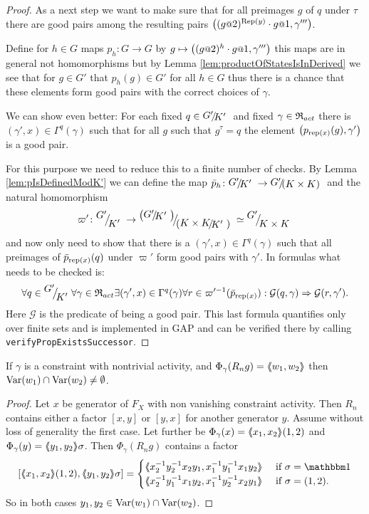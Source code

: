 \documentclass[a4paper,12pt]{article}
\begin{document}
\begin{proof}
 As a next step we want to make sure that for all preimages $g$ of $q$ under $\tau$ there are good pairs among the
 resulting pairs $\left((g\at{2})^{\textup{Rep}(y)}\cdot g\at{1},\gamma'''\right)$.
 
  Define for $h\in G$ maps $p_h\colon G\to G$ by $g\mapsto \left((g\at{2})^{h}\cdot g\at{1},\gamma'''\right)$ this maps are in general not homomorphisms but 
  by Lemma \ref{lem:productOfStatesIsInDerived} we see that for $g\in G'$ that $p_h(g)\in G'$ for all $h\in G$ thus there is a chance that these elements form good pairs with
 the correct choices of $\gamma$. 
 
 We can show even better: For each fixed $q\in\RNK{G'}{K'}$ and fixed $\gamma\in\mathfrak{R}_{act}$ there is $(\gamma',x)\in\Gamma^q(\gamma)$ such that 
 for all $g$ such that $g^\tau=q$ the element $\left(p_{\textup{rep}(x)}(g),\gamma'\right)$ is a good pair. 
 
 For this purpose we need to reduce this to a finite number of checks. By Lemma \ref{lem:pIsDefinedModK'} we can define the map $\bar p_h\colon \RNK{G'}{K'} \to \RNK{G'}{(K\times K)}$
 and the natural homomorphism \[\varpi'\colon \RNK{G'}{K'} \to \RNK{\left(\RNK{G'}{K'}\right)}{\left(\RNK{K\times K}{K'}\right)} \simeq \RNK{G'}{K\times K} \]
 and now only need to show that there is a $(\gamma',x)\in\Gamma^q(\gamma)$ such that all preimages of $\bar p_{\textup{rep}(x)}(q)$ under $\varpi'$ 
 form good pairs with $\gamma'$. In formulas what needs to be checked is: 
 \[\forall q\in\RNK{G'}{K'}
      \forall \gamma\in\Red_{act} 
	 \exists (\gamma',x)\in \Gamma^q(\gamma)
	    \forall r\in \varpi'^{-1}(\bar p_{\textup{rep}(x)}):
	      \mathcal{G}(q,\gamma) \Rightarrow \mathcal{G}(r,\gamma').\]
 Here $\mathcal{G}$ is the predicate of being a good pair. %
 This last formula quantifies only over finite sets and is implemented in GAP and can be verified there by calling \lstinline{verifyPropExistsSuccessor}.
\end{proof}
\begin{lem} \label{lem:commonVar}
 If $\gamma$ is a constraint with nontrivial activity, and $\Phi_\gamma(R_ng)=\langle\negthickspace\langle w_1,w_2\rangle\negthickspace\rangle$ then $\textup{Var}(w_1)\cap\textup{Var}(w_2)\neq \emptyset$.
\end{lem}
\begin{proof}
 Let $x$ be generator of $F_X$ with non vanishing constraint activity. 
 Then $R_n$ contains either a factor $[x,y]$ or $[y,x]$ for another generator $y$. Assume without loss of generality the first case.
 Let further be $\Phi_\gamma(x)=\langle\negthickspace\langle x_1,x_2\rangle\negthickspace\rangle(1,2)$ and $\Phi_\gamma(y)=\langle\negthickspace\langle y_1,y_2\rangle\negthickspace\rangle\sigma$. 
 Then $\Phi_\gamma(R_n g)$ contains a factor 
 \[ [\pair{x_1,x_2}(1,2),\pair{y_1,y_2}\sigma] = \begin{cases}
                                                   \pair{x_2^{-1}y_2^{-1}x_2y_1,x_1^{-1}y_1^{-1}x_1y_2} & \textup{ if } \sigma=\id \\
                                                   \pair{x_2^{-1}y_1^{-1}x_1y_2,x_1^{-1}y_2^{-1}x_2y_1} & \textup{ if } \sigma=(1,2) . \\
                                                 \end{cases}
\] So in both cases $y_1,y_2\in \textup{Var}(w_1)\cap \textup{Var}(w_2)$. 
\end{proof}
\end{document}
